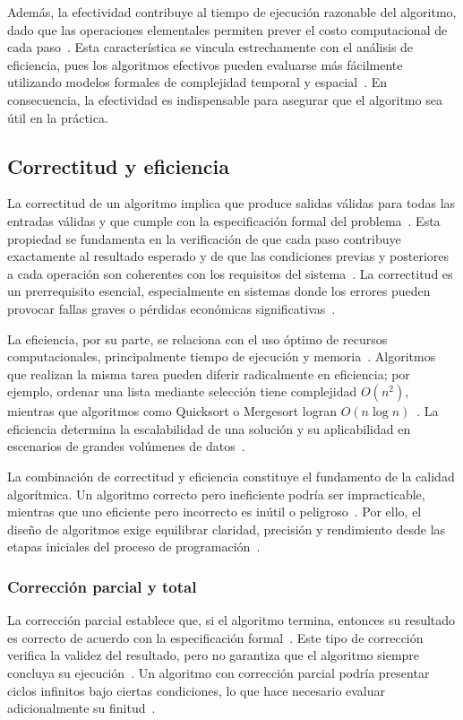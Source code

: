 \documentclass[12pt,twoside]{book}
\begin{document}
					Además, la efectividad contribuye al tiempo de ejecución razonable del algoritmo, dado que las operaciones elementales permiten prever el costo computacional de cada paso~\cite{Pressman2019Software}. Esta característica se vincula estrechamente con el análisis de eficiencia, pues los algoritmos efectivos pueden evaluarse más fácilmente utilizando modelos formales de complejidad temporal y espacial~\cite{Stallings2021Computer}. En consecuencia, la efectividad es indispensable para asegurar que el algoritmo sea útil en la práctica.
		
				\subsection{Correctitud y eficiencia}
					La correctitud de un algoritmo implica que produce salidas válidas para todas las entradas válidas y que cumple con la especificación formal del problema~\cite{Pressman2019Software}. Esta propiedad se fundamenta en la verificación de que cada paso contribuye exactamente al resultado esperado y de que las condiciones previas y posteriores a cada operación son coherentes con los requisitos del sistema~\cite{Sommerville2015Software}. La correctitud es un prerrequisito esencial, especialmente en sistemas donde los errores pueden provocar fallas graves o pérdidas económicas significativas~\cite{Stallings2021Computer}.
					
					La eficiencia, por su parte, se relaciona con el uso óptimo de recursos computacionales, principalmente tiempo de ejecución y memoria~\cite{Tanenbaum2021Structured}. Algoritmos que realizan la misma tarea pueden diferir radicalmente en eficiencia; por ejemplo, ordenar una lista mediante selección tiene complejidad \(O(n^2)\), mientras que algoritmos como Quicksort o Mergesort logran \(O(n \log n)\)~\cite{Pressman2019Software}. La eficiencia determina la escalabilidad de una solución y su aplicabilidad en escenarios de grandes volúmenes de datos~\cite{Sommerville2015Software}.
					
					La combinación de correctitud y eficiencia constituye el fundamento de la calidad algorítmica. Un algoritmo correcto pero ineficiente podría ser impracticable, mientras que uno eficiente pero incorrecto es inútil o peligroso~\cite{Stallings2021Computer}. Por ello, el diseño de algoritmos exige equilibrar claridad, precisión y rendimiento desde las etapas iniciales del proceso de programación~\cite{Pressman2019Software}.
						
					\subsubsection{Corrección parcial y total}
						La corrección parcial establece que, si el algoritmo termina, entonces su resultado es correcto de acuerdo con la especificación formal~\cite{Sommerville2015Software}. Este tipo de corrección verifica la validez del resultado, pero no garantiza que el algoritmo siempre concluya su ejecución~\cite{Pressman2019Software}. Un algoritmo con corrección parcial podría presentar ciclos infinitos bajo ciertas condiciones, lo que hace necesario evaluar adicionalmente su finitud~\cite{Stallings2021Computer}.
						
\end{document}
